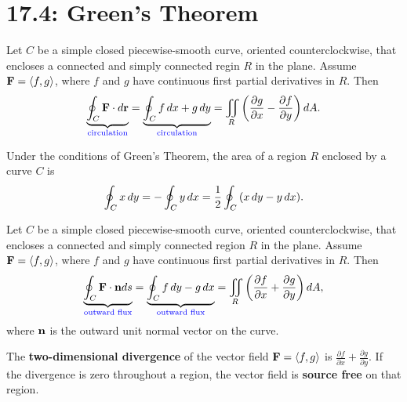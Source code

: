 \documentclass[mathNotesPreamble]{subfiles}
\begin{document}
\section{17.4: Green's Theorem}

  \begin{thmBox*}
    Let $C$ be a simple closed piecewise-smooth curve, oriented counterclockwise, that encloses a connected and simply connected regin $R$ in the plane. Assume $\mathbf F={\left\langle f,g \right\rangle}$, where $f$ and $g$ have continuous first partial derivatives in $R$. Then
      \[\underbrace{\oint_C \mathbf F\cdot d{\mathbf{r}}}_{\textcolor{blue}{\textnormal{circulation}}}=\underbrace{\oint_C f\,dx+g\,dy}_{\textcolor{blue}{\textnormal{circulation}}}=\iint\limits_R{\left(\frac{\partial g}{\partial x}-\frac{\partial f}{\partial y}\right)}\,dA.\]
  \end{thmBox*}

  \begin{thmBox*}
    Under the conditions of Green's Theorem, the area of a region $R$ enclosed by a curve $C$ is
      \[\oint_C x\,dy=-\oint_C y\,dx=\frac{1}{2}\oint_C{\left(x\,dy-y\,dx\right)}.\]
  \end{thmBox*}

  \begin{thmBox*}
    Let $C$ be a simple closed piecewise-smooth curve, oriented counterclockwise, that encloses a connected and simply connected region $R$ in the plane. Assume $\mathbf F={\left\langle f,g \right\rangle}$, where $f$ and $g$ have continuous first partial derivatives in $R$. Then
      \[\underbrace{\oint_C \mathbf F\cdot {\mathbf{n}} ds}_{\textcolor{blue}{\textnormal{outward flux}}}=\underbrace{\oint_C f\,dy-g\,dx}_{\textcolor{blue}{\textnormal{outward flux}}}=\iint\limits_R{\left(\frac{\partial f}{\partial x}+\frac{\partial g}{\partial y}\right)}\,dA,\]
    where ${\mathbf{n}}$ is the outward unit normal vector on the curve.
  \end{thmBox*}

  \begin{defn*}
    The \textbf{two-dimensional divergence} of the vector field $\mathbf F={\left\langle f,g \right\rangle}$ is $\displaystyle \frac{\partial f}{\partial x}+\frac{\partial g}{\partial y}$. If the divergence is zero throughout a region, the vector field is \textbf{source free} on that region.
  \end{defn*}
\end{document}

